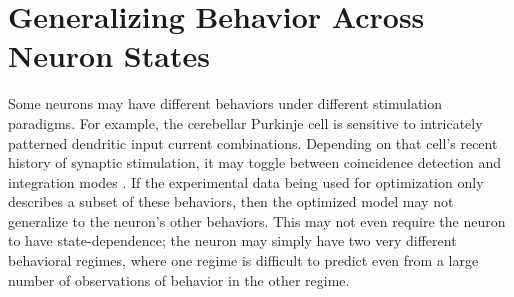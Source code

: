 \section{Generalizing Behavior Across Neuron States}
Some neurons may have different behaviors under different stimulation paradigms. 
For example, the cerebellar Purkinje cell is sensitive to intricately patterned dendritic input current combinations.
Depending on that cell’s recent history of synaptic stimulation, it may toggle between coincidence detection and integration modes \cite{ratte2013impact}.
If the experimental data being used for optimization only describes a subset of these behaviors, then the optimized model may not generalize to the neuron's other behaviors.
This may not even require the neuron to have state-dependence; the neuron may simply have two very different behavioral regimes, where one regime is difficult to predict even from a large number of observations of behavior in the other regime.






